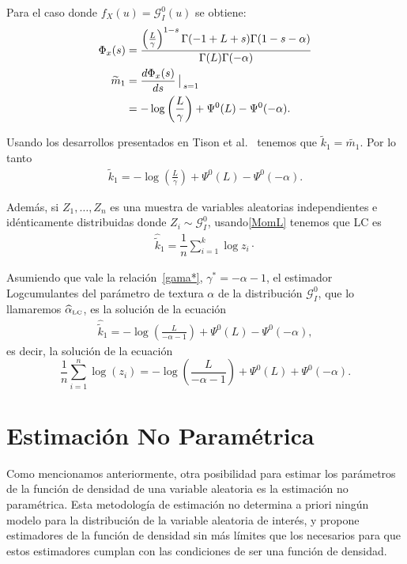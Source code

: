 Para el caso donde $f_X(u) = \mathcal{G}_I^0(u)$ se obtiene:
	\begin{align}
	\Phi_x(s) &= \dfrac{\left(\frac{L}{\gamma}\right)^{1-s}\Gamma(-1+L+s)\Gamma(1-s-\alpha)}{\Gamma(L)\Gamma(-\alpha)} \\
	\vspace{1cm}
	\nonumber \widetilde{m}_1 &=  \frac{d \Phi_x(s)}{ds } \big\arrowvert _{s=1}\\
					& = -\log\left(\frac{L}{\gamma}\right) + \Psi^0(L) - \Psi^0(-\alpha).
	\end{align}

Usando los desarrollos presentados en Tison et al.~\cite{Tison2004} tenemos que $\widetilde{k}_1 = \widetilde{m_1}$. Por lo tanto 
\begin{align}
\label{MomLC}
\widetilde{k}_1 =   -\log \left(\frac{L}{\gamma}\right) + \Psi^0(L) - \Psi^0(-\alpha).
\end{align}

Además, si $Z_1,\ldots,Z_n$ es una muestra de variables aleatorias independientes e idénticamente distribuidas donde $Z_i \sim \mathcal{G}_I^0$, usando\eqref{MomL} tenemos que LC es
\begin{align}
\label{EstimadorMomLC}
\widehat{\widetilde{k}}_1 =\dfrac{1}{n} \sum_{i=1}^k\log z_i\cdot
\end{align}

Asumiendo que vale la relación~\eqref{gama*}, $\gamma^*=-\alpha-1$, el estimador Logcumulantes del parámetro de textura $\alpha$ de la distribución $\mathcal{G}_I^0$, que lo llamaremos $\widehat\alpha_{\text{\tiny{LC}}}$, es la solución de la ecuación    
\begin{align}
\widehat{\widetilde{k}}_1 =   -\log \left(\frac{L}{-\alpha-1}\right) + \Psi^0(L) - \Psi^0(-\alpha),
\end{align}
es decir, la solución de la ecuación
\begin{equation} \label{eq:logm}
\frac{1}{n} \sum_{i=1}^n\log (z_i) =   -\log \left(\frac{L}{-\alpha-1}\right) + \Psi^0(L) + \Psi^0(-\alpha).
\end{equation}


\section{Estimación No Paramétrica}

Como mencionamos anteriormente, otra posibilidad para estimar los parámetros de la función de densidad de una variable aleatoria es la estimación no paramétrica. Esta metodología de estimación  no determina a priori ningún modelo para la distribución de la variable aleatoria de interés, y propone estimadores de la función de densidad sin más límites que los necesarios para que estos estimadores cumplan con las condiciones de ser una función de densidad.


